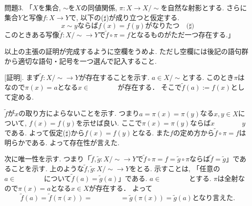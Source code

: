 \documentclass[dvipdfmx,a4paper,11pt]{article}
\theoremstyle{definition}
\begin{document}
問題3. 「$X$を集合, $\sim$を$X$の同値関係, $\pi : X\to X/\sim $を自然な射影とする. 
さらに集合$Y$と写像$f : X \to Y$で, 以下の($\sharp$)が成り立つと仮定する. 
$$
x \sim y \text{ならば} f(x)=f(y) \text{がなりたつ}\quad \text{($\sharp$)}
$$	
このときある写像$\widetilde{f} : X/\sim \to Y$で$\widetilde{f} \circ \pi =f$となるものがただ一つ存在する.」

以上の主張の証明が完成するように空欄をうめよ. ただし空欄には後記の語句群から適切な語句・記号を一つ選んで記入すること.

[証明].
まず$\widetilde{f} : X/\sim \to Y$が存在することを示す. 
$a \in X/\sim$とする. 
このとき$\pi$は\boxed{\phantom{hogehoge}}なので$\pi(x) =a$となる$x \in \boxed{\phantom{hogehoge}}$が存在する．
そこで$\widetilde{f}(a):=f(x)$として定める.

$\widetilde{f}$が$x$の取り方によらないことを示す.%
つまり$a=\pi(x)=\pi(y)$なる$x,y \in X$について, $f(x)=f(y)$を示せば良い.
ここで$\pi(x)=\pi(y)$ならば$x \boxed{\phantom{hogehoge}} y$である. 
よって仮定($\sharp$)から$f(x)=f(y)$となる.
また$f$の定め方から$\widetilde{f} \circ \pi =f$は明らかである.
よって存在性が言えた. 

次に唯一性を示す. つまり「$\widetilde{f}, \widetilde{g} : X/\sim \to Y$で$\widetilde{f} \circ \pi =f = \widetilde{g} \circ \pi $ならば$\widetilde{f}=\widetilde{g}$」であることを示す.
上のような$\widetilde{f}, \widetilde{g} :  X/\sim  \to Y$をとる. 
示すことは, 「任意の$a\in  \boxed{\phantom{hogehoge}}$について$\widetilde{f}(a)=\widetilde{g}(a)$」である.
$a \in  \boxed{\phantom{hogehoge}}$とする. 
$\pi$は全射なので$\pi(x) =a$となる$x \in X$が存在する．
よって
$$
\widetilde{f}(a) =
\widetilde{f}(\pi(x)) =
\boxed{\phantom{hogehoge}}
=
\widetilde{g}(\pi(x)) =
\widetilde{g}(a) \text{となり言えた.}
$$
\end{document}
